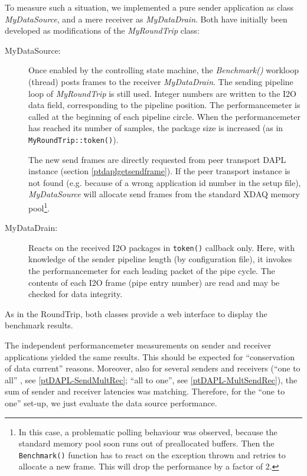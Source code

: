 To measure such a situation, we implemented a pure
sender application as class {\em MyDataSource}, and a mere
receiver as {\em MyDataDrain}. Both have initially been developed as
modifications of the {\em MyRoundTrip} class: 

\begin{description}
\item [MyDataSource:]  Once enabled by the controlling state machine,
the {\em Benchmark()} workloop (thread) 
posts frames to the receiver {\em MyDataDrain}. 
The sending pipeline loop of {\em MyRoundTrip} is still used.
Integer numbers are written to the I2O data field,
corresponding to the pipeline position. 
The performancemeter is called at the beginning of each pipeline circle. 
When the performancemeter has reached its number of samples, 
the package size is increased (as in {\tt MyRoundTrip::token()}). 

The new send frames are directly requested from peer transport DAPL instance
(section \ref{ptdaplgetsendframe}). If the peer transport instance 
is not found (e.g. because of a wrong application id 
number in the setup file),  {\em MyDataSource} will allocate send 
frames from the standard 
XDAQ memory pool\footnote{ 
In this case, a problematic polling behaviour was observed, 
because the standard  memory pool soon runs out of preallocated 
buffers.  Then the {\tt Benchmark()} function has to react on the 
exception  thrown and retries to allocate a new frame. 
This will drop the performance by a factor of 2.}.
 

\item [MyDataDrain:] Reacts on the received  I2O packages in 
{\tt token()} callback only.  
Here, with knowledge of the sender pipeline length (by configuration file), 
it invokes the performancemeter for each leading packet of the pipe cycle. 
The contents of each I2O frame (pipe entry number) 
are read and may be checked for data integrity.

\end{description} 
 



As in the RoundTrip, both classes provide 
a web interface to display the benchmark results.

The independent performancemeter measurements on sender and receiver
applications yielded the same results. This should be expected for
``conservation of data current'' reasons. Moreover, also for several
senders and receivers (``one to all'' , see \ref{ptDAPL-SendMultRec}; 
``all to one'', see \ref{ptDAPL-MultSendRec}), the sum of
sender and receiver latencies was matching.
Therefore, for the ``one to one'' set-up, 
we just evaluate the data source performance.


